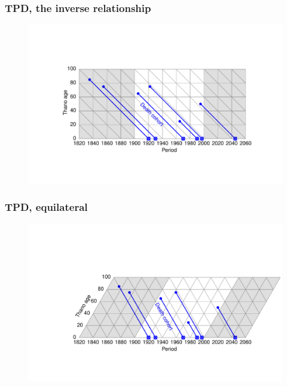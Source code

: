 \documentclass[20pt]{beamer}
\begin{document}
\begin{frame}
\frametitle{TPD, the inverse relationship}
\begin{figure}[b]
    \centering
    \includegraphics{Figures/LabPres/TPD2.pdf}
\end{figure} 
\end{frame}

\begin{frame}
\frametitle{TPD, equilateral}
\begin{figure}[b]
    \centering
    \includegraphics{Figures/LabPres/TPD3.pdf}
\end{figure} 
\end{frame}
\end{document}
